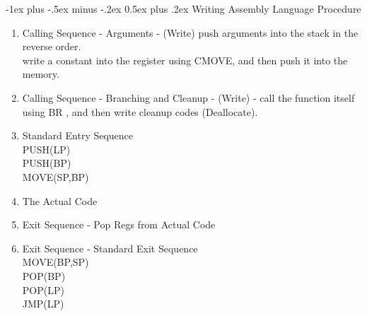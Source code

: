 \documentclass[9pt,landscape]{extarticle}
\makeatletter
\renewcommand{\section}{\@startsection{section}{1}{0mm}%
                                {-1ex plus -.5ex minus -.2ex}%
                                {0.5ex plus .2ex}%
                                {\normalfont\large\bfseries}}
\makeatother
\begin{document}
\begin{multicols*}{4}
\section{Writing Assembly Language Procedure}
\begin{enumerate}
\item Calling Sequence - Arguments - (Write) push arguments into the stack in the reverse order. \\ 
write a constant into the register using CMOVE, and then push it into the memory.
\item Calling Sequence - Branching and Cleanup - (Write) - call the function itself using
BR , and then write cleanup codes (Deallocate).
\item Standard Entry Sequence \\
PUSH(LP) \\
PUSH(BP) \\
MOVE(SP,BP) \\
\item The Actual Code
\item Exit Sequence - Pop Regs from Actual Code
\item Exit Sequence - Standard Exit Sequence \\
MOVE(BP,SP) \\
POP(BP) \\
POP(LP) \\
JMP(LP) \\
\end{enumerate}







\end{multicols*}
\end{document}
